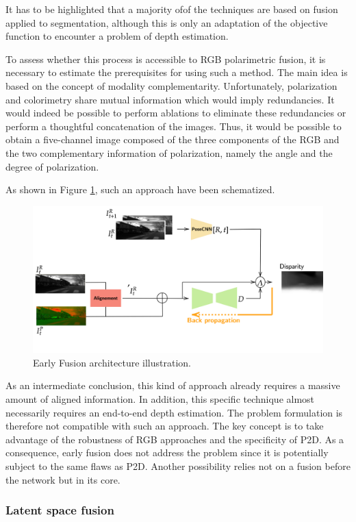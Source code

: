 It has to be highlighted that a majority ofof the techniques are based on fusion applied to segmentation, although this is only an adaptation of the objective function to encounter a problem of depth estimation.


To assess whether this process is accessible to RGB polarimetric fusion, it is necessary to estimate the prerequisites for using such a method. The main idea is based on the concept of modality complementarity. Unfortunately, polarization and colorimetry share mutual information which would imply redundancies. It would indeed be possible to perform ablations to eliminate these redundancies or perform a thoughtful concatenation of the images. Thus, it would be possible to obtain a five-channel image composed of the three components of the RGB and the two complementary information of polarization, namely the angle and the degree of polarization. 


As shown in Figure \ref{fig:earlyf}, such an approach have been schematized.


\begin{figure}[h]
	\centering
	\includegraphics[width=0.8\linewidth]{Figures/Fusion/earlyf}
	\caption[Early Fusion architecture illustration.]{Early Fusion architecture illustration.}
	\label{fig:earlyf}
\end{figure}


As an intermediate conclusion, this kind of approach already requires a massive amount of aligned information. In addition, this specific technique almost necessarily requires an end-to-end depth estimation. The problem formulation is therefore not compatible with such an approach. The key concept is to take advantage of the robustness of RGB approaches and the specificity of P2D. As a consequence, early fusion does not address the problem since it is potentially subject to the same flaws as P2D. 
Another possibility relies not on a fusion before the network but in its core.

\subsubsection{Latent space fusion}

